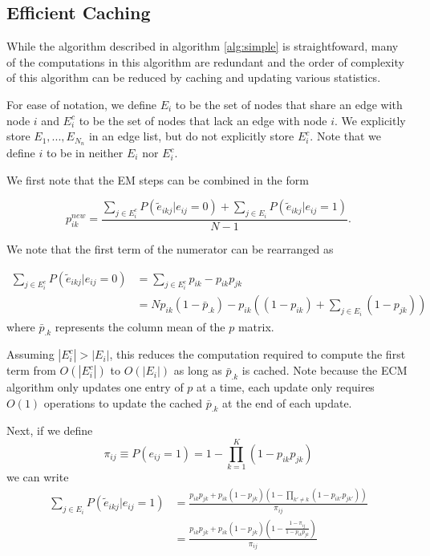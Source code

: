 \documentclass[11pt]{amsart}
\newcommand{\latentedge}{\tilde e}
\begin{document}
\subsection{Efficient Caching}
 
While the algorithm described in algorithm \ref{alg:simple} is straightfoward, 
many of the computations in this algorithm are redundant and the order of complexity 
of this algorithm can be reduced by caching and updating various statistics. 

For ease of notation, we define $E_i$ to be the set of nodes that share an edge with 
node $i$ and $E_i^c $ to be the set of nodes that lack an edge with node $i$. We explicitly 
store $E_1,...,E_{N_n}$ in an edge list, but do not explicitly store $E_i^c$. Note that we define 
$i$ to be in neither $E_i$ nor $E_i^c$. 

We first note that the EM steps can be combined in the form 

\begin{equation} \label{eq:combineEM}
 p^{new}_{ik} =  \frac{ \displaystyle  \sum_{j \in E_i^c} P( \latentedge_{ikj} | e_{ij} = 0) + \sum_{j \in E_i } P( \latentedge_{ikj} | e_{ij} = 1) } {N - 1}.
\end{equation}

We note that the first term of the numerator can be rearranged as 

\begin{equation} \label{eq:noEdgeCont}
\begin{split}
\displaystyle \sum_{j \in E_i^c} P( \latentedge_{ikj} | e_{ij} = 0)  & = \sum_{j \in E_i^c} p_{ik} - p_{ik} p_{jk} \\
 & = N p_{ik} (1 - \bar{p}_{.k} ) -  p_{ik} \left( (1 - p_{ik})  + \sum_{j \in E_i} (1 - p_{jk})  \right)
 \end{split}
\end{equation} 
where $\bar p_{.k}$ represents the column mean of the $p$ matrix.

Assuming $| E_i ^c | > | E_i |$, this reduces the computation required to compute the first term from $O( | E_i ^ c | )$ to $O( | E_i |)$
as long as $\bar p_{.k}$ is cached. 
Note because the ECM algorithm only updates one entry of $p$ at a time, each update 
only requires $O(1)$ operations to update the cached $\bar p_{.k}$ at the end of each update. 

Next, if we define 
\begin{equation} \label{eq:edgeProb}
\pi_{ij} \equiv P(e_{ij} = 1) = 1 - \prod_{k = 1}^K( 1 - p_{ik}p_{jk} )
\end{equation}
we can write 
\begin{equation} \label{eq:edgeCont}
\begin{split}
\sum_{j \in E_i } P( \latentedge_{ikj} | e_{ij} = 1)  & 
             = \frac{ p_{ik} p_{jk} + p_{ik} (1 - p_{jk}) \left( 1 - \prod_{k' \neq k} ( 1 - p_{ik'} p_{jk'} ) \right) } {\pi_{ij} }  \\
	&  = \frac{ p_{ik} p_{jk} + p_{ik} (1 - p_{jk}) \left( 1 - \frac{ 1 -\pi_{ij} }{ 1 - p_{ik} p_{jk} } \right) }{ \pi_{ij} } \\ 
\end{split}
\end{equation}
\end{document}
